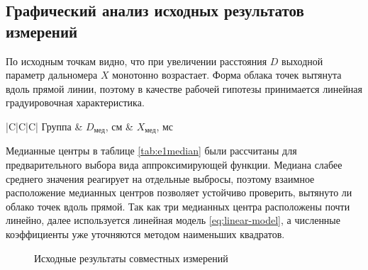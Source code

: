 \documentclass[12pt,a4paper]{article}
\begin{document}
\subsection{Графический анализ исходных результатов измерений}

По исходным точкам видно, что при увеличении расстояния $D$ выходной
параметр дальномера $X$ монотонно возрастает. Форма облака точек вытянута
вдоль прямой линии, поэтому в качестве рабочей гипотезы принимается линейная
градуировочная характеристика.

\begin{table}[H]
\caption{Медианные центры для предварительного выбора модели}
\label{tab:e1median}
\begin{tabularx}{\textwidth}{|C|C|C|}
\hline
Группа & $D_{\text{мед}}$, см & $X_{\text{мед}}$, мс\\
\hline
{}
\end{tabularx}
\end{table}

Медианные центры в таблице \ref{tab:e1median} были рассчитаны для предварительного 
выбора вида аппроксимирующей функции. Медиана слабее среднего значения реагирует
на отдельные выбросы, поэтому взаимное расположение медианных центров
позволяет устойчиво проверить, вытянуто ли облако точек вдоль прямой.
Так как три медианных центра расположены почти линейно, далее используется
линейная модель \eqref{eq:linear-model}, а численные коэффициенты уже
уточняются методом наименьших квадратов.

\begin{figure}[H]
\centering
{}
\caption{Исходные результаты совместных измерений}
\label{fig:e1points}
\end{figure}
\end{document}
